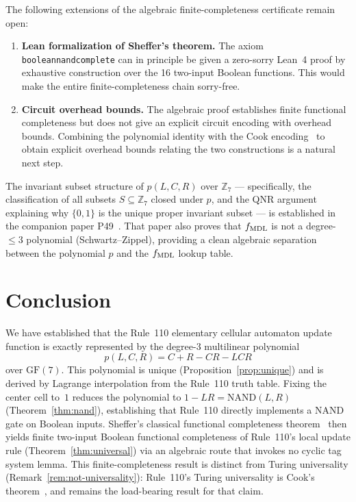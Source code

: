 \documentclass[11pt]{article}
\theoremstyle{remark}
\newcommand{\lean}[1]{%
  \penalty-100
  \begingroup\def\_{\textunderscore\allowbreak}\texttt{#1}\endgroup}
\begin{document}
The following extensions of the algebraic finite-completeness certificate remain open:

\begin{enumerate}[leftmargin=*]
  \item \textbf{Lean formalization of Sheffer's theorem.}
    The axiom \lean{boolean\_nand\_complete} can in principle be given a zero-sorry
    Lean~4 proof by exhaustive construction over the 16 two-input Boolean functions.
    This would make the entire finite-completeness chain sorry-free.
  \item \textbf{Circuit overhead bounds.}
    The algebraic proof establishes finite functional completeness but does not give
    an explicit circuit encoding with overhead bounds.
    Combining the polynomial identity with the Cook encoding~\cite{Cook2009} to
    obtain explicit overhead bounds relating the two constructions is a natural next step.
\end{enumerate}

The invariant subset structure of $p(L,C,R)$ over $\mathbb{Z}_7$ --- specifically,
the classification of all subsets $S \subseteq \mathbb{Z}_7$ closed under $p$, and
the QNR argument explaining why $\{0,1\}$ is the unique proper invariant subset ---
is established in the companion paper P49~\cite{SpivackGTEPolynomialWolfram}.
That paper also proves that $f_{\rm MDL}$ is not a degree-$\leq 3$ polynomial
(Schwartz--Zippel), providing a clean algebraic separation between the polynomial $p$
and the $f_{\rm MDL}$ lookup table.

\section{Conclusion}
\label{sec:conclusion}

We have established that the Rule~110 elementary cellular automaton update function is
exactly represented by the degree-3 multilinear polynomial
\[
  p(L,C,R) = C + R - CR - LCR
\]
over $\mathrm{GF}(7)$.
This polynomial is unique (Proposition~\ref{prop:unique}) and is derived by
Lagrange interpolation from the Rule~110 truth table.
Fixing the center cell to~$1$ reduces the polynomial to $1 - LR = \mathrm{NAND}(L,R)$
(Theorem~\ref{thm:nand}), establishing that Rule~110 directly implements a NAND
gate on Boolean inputs.
Sheffer's classical functional completeness theorem~\cite{Sheffer1913} then yields
finite two-input Boolean functional completeness of Rule~110's local update rule
(Theorem~\ref{thm:universal}) via an algebraic route that invokes no cyclic tag
system lemma.
This finite-completeness result is distinct from Turing universality
(Remark~\ref{rem:not-universality}): Rule~110's Turing universality is Cook's
theorem~\cite{Cook2004}, and remains the load-bearing result for that claim.
\end{document}
